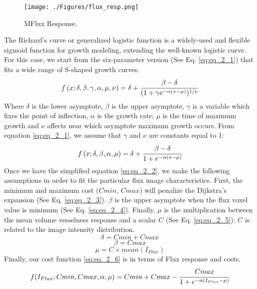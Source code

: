 \begin{figure}[ht]
	\centering
		\texttt{[image: ./Figures/flux\_resp.png]}
	\caption[MFlux Response]{MFlux Response.}
	\label{fig:flux_resp}
\end{figure}

The Richard's curve \citep{Richards1959} or generalized logistic function is a widely-used and flexible sigmoid function for growth modeling, extending the well-known logistic curve. For this case, we start from the six-parameter version (See Eq. \ref{eq:eq_2_1}) that fits a wide range of S-shaped growth curves. 
\begin{equation}
\label{eq:eq_2_1}
f\left( x;\delta,\beta,\gamma,\alpha,\mu,\nu\right) = \delta + \cfrac{\beta-\delta}{(1+\gamma e^{-\alpha(x-\mu)})^{1/\nu}}
\end{equation}
Where $\delta$ is the lower asymptote, $\beta$ is the upper asymptote, $\gamma$ is a variable which fixes the point of inflection, $\alpha$ is the growth rate; $\mu$ is the time of maximum growth and $\nu$ affects near which asymptote maximum growth occurs.
From equation \ref{eq:eq_2_1}, we assume that $\gamma$ and $\nu$ are constants equal to 1:
\begin{equation}
\label{eq:eq_2_2}
f\left( x;\delta,\beta,\alpha,\mu\right) = \delta + \cfrac{\beta-\delta}{1+e^{-\alpha(x-\mu)}}
\end{equation}
Once we have the simplified equation \ref{eq:eq_2_2}, we make the following assumptions in order to fit the particular flux image characteristics. First, the minimum and maximum cost ($Cmin$, $Cmax$) will penalize the Dijkstra's expansion (See Eq. \ref{eq:eq_2_3}). $\beta$ is the upper asymptote when the flux voxel value is minimum (See Eq. \ref{eq:eq_2_4}). Finally, $\mu$ is the multiplication between the mean volume vesselness response and a scalar $C$ (See Eq. \ref{eq:eq_2_5}). $C$ is related to the image intensity distribution.
\begin{equation}
\label{eq:eq_2_3}
\delta = Cmin + Cmax
\end{equation}
\begin{equation}
\label{eq:eq_2_4}
\beta = Cmax
\end{equation}
\begin{equation}
\label{eq:eq_2_5}
\mu = C \times mean(I_{Flux}) 
\end{equation}
Finally, our cost function \ref{eq:eq_2_6} is in terms of Flux response and costs.
\begin{equation}
\label{eq:eq_2_6}
f( I_{Flux};Cmin, Cmax, \alpha,\mu) = Cmin + Cmax - \cfrac{Cmax}{1+e^{-\alpha(I_{Flux}-\mu)}}
\end{equation}

